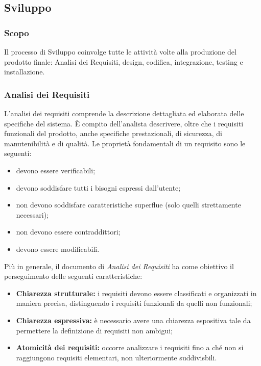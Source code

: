 \subsection{Sviluppo}
\subsubsection{Scopo}
Il processo di Sviluppo coinvolge tutte le attività volte alla produzione del prodotto finale: Analisi dei Requisiti,  design, codifica, integrazione, testing e installazione.
\subsubsection{Analisi dei Requisiti}
L'analisi dei requisiti comprende la descrizione dettagliata ed elaborata delle specifiche del sistema. È compito dell'analista descrivere, oltre che i requisiti funzionali del prodotto, anche specifiche prestazionali, di sicurezza, di manutenibilità e di qualità. Le proprietà fondamentali di un requisito sono le seguenti:
\begin{itemize}
	\item devono essere verificabili;
	\item devono soddisfare tutti i bisogni espressi dall'utente;
	\item non devono soddisfare caratteristiche superflue (solo quelli strettamente necessari);
	\item non devono essere contraddittori;
	\item devono essere modificabili.
\end{itemize} 
Più in generale, il documento di \textit{Analisi dei Requisiti\doc} ha come obiettivo il perseguimento delle seguenti caratteristiche:
\begin{itemize}
	\item \textbf{Chiarezza strutturale:} i requisiti devono essere classificati e organizzati in maniera precisa, distinguendo i requisiti funzionali da quelli non funzionali;
	\item \textbf{Chiarezza espressiva:} è necessario avere una chiarezza espositiva tale da permettere la definizione di requisiti non ambigui;
	\item \textbf{Atomicità dei requisiti:} occorre analizzare i requisiti fino a ché non si raggiungono requisiti elementari, non ulteriormente suddivisbili.  
\end{itemize}

